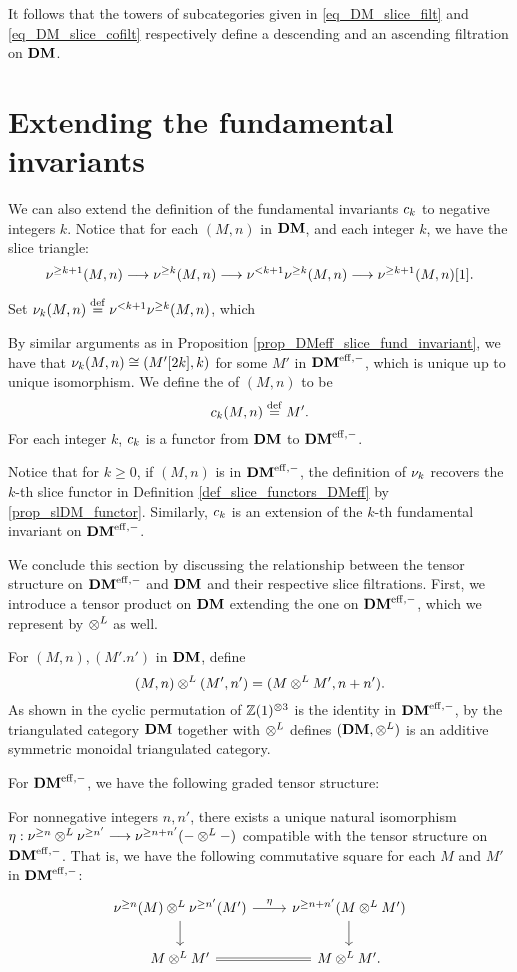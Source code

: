 It follows that the towers of subcategories given in 
\eqref{eq_DM_slice_filt} and \eqref{eq_DM_slice_cofilt} 
respectively define a descending and an ascending filtration on 
$\mathbf{DM}$.

\section{Extending the fundamental invariants}

We can also extend the definition of the fundamental invariants
$c_{k}$ to negative integers $k$. Notice that for each $(M, n)$
in $\mathbf{DM}$, and each integer $k$, we have the slice triangle:
\[
\nu^{\geq k + 1}(M, n) \longrightarrow \nu^{\geq k}(M, n) \longrightarrow \nu^{< k + 1}\nu^{\geq k}(M, n)
\longrightarrow \nu^{\geq k + 1}(M, n)[1].
\]

\begin{defn}
Set $\nu_{k}(M, n) \stackrel{\mathrm{def}}{=} \nu^{< k + 1}\nu^{\geq k}(M, n)$, which

By similar arguments as in Proposition 
\ref{prop_DMeff_slice_fund_invariant}, we have that 
$\nu_{k}(M, n) \cong (M'[2k], k)$ for some $M'$ in $\mathbf{DM}^{\mathrm{eff},-}$,
which is unique up to unique isomorphism. We 
define the  of $(M, n)$ to be
\[
c_{k}(M, n) \stackrel{\mathrm{def}}{=} M'.
\]
For each integer $k$, $c_{k}$ is a functor from $\mathbf{DM}$ to
$\mathbf{DM}^{\mathrm{eff},-}$.

Notice that for $k \geq 0$, if $(M, n)$ is in $\mathbf{DM}^{\mathrm{eff},-}$, the 
definition of $\nu_{k}$ recovers the $k$-th slice functor
in Definition \ref{def_slice_functors_DMeff} by \ref{prop_slDM_functor}. Similarly,
$c_{k}$ is an extension of the $k$-th fundamental invariant
on $\mathbf{DM}^{\mathrm{eff},-}$.
\end{defn}

We conclude this section by discussing the relationship between the
tensor structure on $\mathbf{DM}^{\mathrm{eff},-}$ and $\mathbf{DM}$ and their respective slice
filtrations. First, we introduce a tensor product on $\mathbf{DM}$ extending
the one on $\mathbf{DM}^{\mathrm{eff},-}$, which we represent by $\otimes^L$ as well.

For $(M, n), (M'. n')$ in $\mathbf{DM}$, define 
\[
(M, n) \otimes^L (M', n') = (M \otimes^L M', n + n'). 
\]
As shown in \cite[15.8]{MVW} the cyclic permutation of 
$\mathbb{Z}(1)^{\otimes 3}$ is the identity in $\mathbf{DM}^{\mathrm{eff},-}$, by 
\cite[8.4A12]{MVW} the triangulated category $\mathbf{DM}$ together with 
$\otimes^L$ defines $(\mathbf{DM}, \otimes^L)$ is an additive symmetric monoidal 
triangulated category.

For $\mathbf{DM}^{\mathrm{eff},-}$, we have the following graded tensor structure:

\begin{prop}\label{prop_tDM_sfilt_DMeff}
For nonnegative integers $n, n'$, there exists a unique natural
isomorphism $\eta: \nu^{\geq n} \otimes^L \nu^{\geq n'} \longrightarrow \nu^{\geq n + n'}(- 
\otimes^L -)$ compatible with the tensor structure on $\mathbf{DM}^{\mathrm{eff},-}$. That 
is, we have the following commutative square for each $M$ and
$M'$ in $\mathbf{DM}^{\mathrm{eff},-}$:
\[
\begin{tikzcd}
\sgDM{n}(M) \tDM \sgDM{n'}(M') \arrow{r}{\eta} \arrow{d} &
\sgDM{n + n'}(M \tDM M') \arrow{d} \\
M \tDM M' \arrow[equals]{r} &
M \tDM M'.
\end{tikzcd}
\]
\end{prop}

